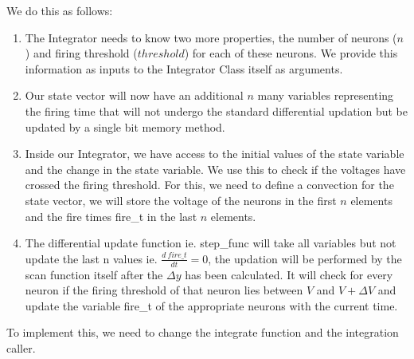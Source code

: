 \documentclass[10pt,letterpaper]{article}
\begin{document}
We do this as follows:
\begin{enumerate}
\item The Integrator needs to know two more properties, the number of neurons ($n$) and firing threshold ($threshold$) for each of these neurons. We provide this information as inputs to the Integrator Class itself as arguments.
\item Our state vector will now have an additional $n$ many variables representing the firing time that will not undergo the standard differential updation but be updated by a single bit memory method.
\item Inside our Integrator, we have access to the initial values of the state variable and the change in the state variable. We use this to check if the voltages have crossed the firing threshold. For this, we need to define a convection for the state vector, we will store the voltage of the neurons in the first $n$ elements and the fire times fire\_t in the last $n$ elements.
\item The differential update function ie. step\_func will take all variables but not update the last n values ie. $\frac{d\ fire\_t}{dt}=0$, the updation will be performed by the scan function itself after the $\Delta y$ has been calculated. It will check for every neuron if the firing threshold of that neuron lies between $V$ and $V + \Delta V$ and update the variable fire\_t of the appropriate neurons with the current time.
\end{enumerate}

To implement this, we need to change the integrate function and the integration caller.
\end{document}
